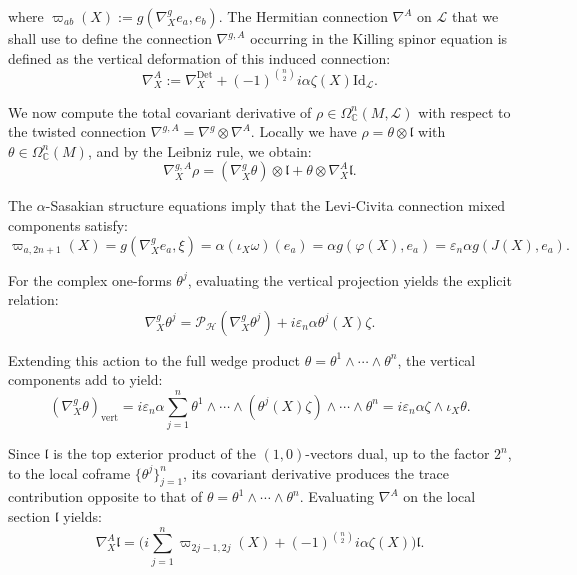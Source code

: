 \documentclass[10pt,a4paper,twoside,reqno]{amsart}
\theoremstyle{plain}
\theoremstyle{definition}
\theoremstyle{remark}
\def\C{\mathbb{C}}
\begin{document}
\noindent
where $\varpi_{ab}(X):=g(\nabla^g_Xe_a,e_b)$. The Hermitian connection $\nabla^A$ on $\mathcal{L}$ that we shall use to define the connection $\nabla^{g,A}$ occurring in the Killing spinor equation is defined as the vertical deformation of this induced connection:
\begin{equation*}
\nabla^A_X := \nabla^{\mathrm{Det}}_X + (-1)^{\binom{n}{2}}i\alpha \zeta(X) \mathrm{Id}_{\mathcal{L}}.
\end{equation*}

We now compute the total covariant derivative of $\rho \in\Omega^n_\C(M,\mathcal{L})$ with respect to the twisted connection $\nabla^{g,A} = \nabla^g \otimes \nabla^A$. Locally we have $\rho = \theta\otimes\mathfrak{l}$ with $\theta\in \Omega^n_{\C}(M)$, and by the Leibniz rule, we obtain:
\begin{equation*}
\nabla^{g,A}_X \rho = (\nabla^g_X \theta) \otimes \mathfrak{l} + \theta \otimes \nabla^A_X \mathfrak{l}.
\end{equation*}

The $\alpha$-Sasakian structure equations imply that the Levi-Civita connection mixed components satisfy:
\begin{equation*}
\varpi_{a, 2n+1}(X) = g(\nabla^g_X e_a, \xi) = \alpha (\iota_X \omega)(e_a)=\alpha g(\varphi(X),e_a)=\varepsilon_n\alpha g(J(X),e_a).
\end{equation*}

\noindent
For the complex one-forms $\theta^j$, evaluating the vertical projection yields the explicit relation:
\begin{equation*}
\nabla^g_X \theta^j = \mathcal{P}_{\mathcal{H}}(\nabla^g_X \theta^j)  + i \varepsilon_n\alpha \theta^j(X) \zeta.
\end{equation*}

\noindent
Extending this action to the full wedge product $\theta = \theta^1 \wedge \cdots \wedge \theta^n$, the vertical components add to yield:
\begin{equation*}
(\nabla^g_X \theta)_{\text{vert}} = i \varepsilon_n\alpha \sum_{j=1}^n \theta^1 \wedge \cdots \wedge (\theta^j(X)\zeta) \wedge \cdots \wedge \theta^n = i \varepsilon_n\alpha \zeta \wedge \iota_X \theta.
\end{equation*}

\noindent
Since $\mathfrak{l}$ is the top exterior product of the $(1,0)$-vectors dual, up to the factor $2^n$, to the local coframe $\{\theta^j\}_{j=1}^n$, its covariant derivative produces the trace contribution opposite to that of $\theta=\theta^1\wedge\cdots\wedge\theta^n$. Evaluating $\nabla^A$ on the local section $\mathfrak{l}$ yields:
\begin{equation*}
\nabla^A_X \mathfrak{l} = \Big(i\sum_{j=1}^n \varpi_{2j-1, 2j}(X) + (-1)^{\binom{n}{2}}i\alpha\zeta(X)\Big)\mathfrak{l}.
\end{equation*}
\end{document}
